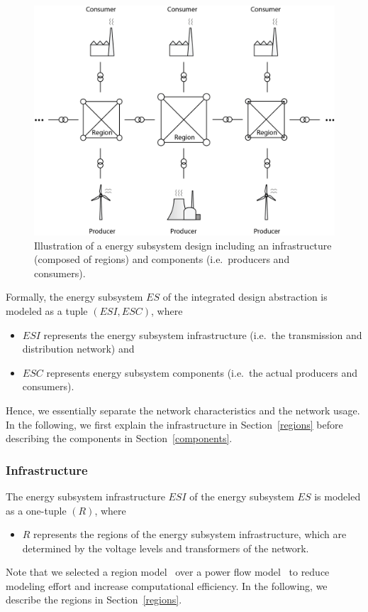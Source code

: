 \begin{figure}[h]
	\includegraphics[width=\columnwidth]{./gfx/energy_system.png}
	\caption{Illustration of a energy subsystem design including an infrastructure (composed of regions) and components (i.e.\ producers and consumers).}
	\label{energy_illustration}
\end{figure}

Formally, the energy subsystem $ES$ of the integrated design abstraction is modeled as a tuple $(ESI, ESC)$, where
\begin{itemize}
	\item $ESI$ represents the energy subsystem infrastructure (i.e.\ the transmission and distribution network) and
	\item $ESC$ represents energy subsystem components (i.e.\ the actual producers and consumers).
\end{itemize}
Hence, we essentially separate the network characteristics and the network usage. In the following, we first explain the infrastructure in Section~\ref{regions} before describing the components in Section~\ref{components}.

\subsubsection{Infrastructure}
\label{energy_infrastructure}

The energy subsystem infrastructure $ESI$ of the energy subsystem $ES$ is modeled as a one-tuple $(R)$, where
\begin{itemize}
	\item $R$ represents the regions of the energy subsystem infrastructure, which are determined by the voltage levels and transformers of the network.
\end{itemize}
Note that we selected a region model~\cite{Hackenberg2012} over a power flow model~\cite{Dommel1968} to reduce modeling effort and increase computational efficiency. In the following, we describe the regions in Section~\ref{regions}.

